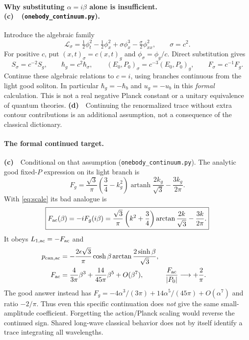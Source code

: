\documentclass[11pt,a4paper]{article}
\newcommand{\Lc}{\textbf{(c)}\ }
\newcommand{\Ld}{\textbf{(d)}\ }
\newcommand{\CC}{\texttt{onebody\_\allowbreak continuum.py}}
\begin{document}
\paragraph{Why substituting $\alpha=i\beta$ alone is insufficient.
\Lc\ (\CC).}
Introduce the algebraic family
\begin{equation}
 \mathcal L_\sigma=\tfrac12\phi_t^2-\tfrac12\phi_x^2
             +\sigma\phi_x^3-\tfrac\sigma2\phi_{xx}^2,
 \qquad \sigma=c^2.
\end{equation}
For positive $c$, put $(x,t)_\sigma=c(x,t)_g$ and
$\phi_\sigma=\phi_g/c$. Direct substitution gives
\begin{equation}
 S_\sigma=c^{-2}S_g,\qquad \hbar_g=c^2\hbar_\sigma,
 \qquad (E_0,P_0)_\sigma=c^{-3}(E_0,P_0)_g,
 \qquad F_\sigma=c^{-1}F_g. \label{eq:scale}
\end{equation}
Continue these algebraic relations to $c=i$, using branches continuous
from the light good soliton. In particular $\hbar_g=-\hbar_b$ and
$u_g=-u_b$ in this \emph{formal} calculation. This is not a real negative
Planck constant or a unitary equivalence of quantum theories.
\Ld\ Continuing the renormalized trace without extra contour contributions
is an additional assumption, not a consequence of the classical dictionary.

\paragraph{The formal continued target.}
\Lc\ Conditional on that assumption (\CC).
The analytic good fixed-$P$ expression on its light branch is
\begin{equation}
 F_g=\frac{\sqrt3}{\pi}\left(\frac34-k_g^2\right)
        \operatorname{artanh}\frac{2k_g}{\sqrt3}
           -\frac{3k_g}{2\pi}.
\end{equation}
With \eqref{eq:scale} its bad analogue is
\begin{equation}
 \boxed{F_{\rm ac}(\beta)=-iF_g(i\beta)
   =\frac{\sqrt3}{\pi}\left(k^2+\frac34\right)
          \arctan\frac{2k}{\sqrt3}-\frac{3k}{2\pi}.} \label{eq:Fac}
\end{equation}
It obeys $L_{1,\rm ac}=-F_{\rm ac}$ and
\begin{align}
 p_{\rm can,ac}&=-\frac{2\epsilon\sqrt3}{\pi}\cosh\beta
                      \arctan\frac{2\sinh\beta}{\sqrt3},\\
 F_{\rm ac}&=\frac4{3\pi}\beta^3+\frac{14}{45\pi}\beta^5+O(\beta^7),
 &\frac{F_{\rm ac}}{|P_0|}&\longrightarrow+\frac2\pi. \label{eq:aclimit}
\end{align}
The good answer instead has
$F_g=-4\alpha^3/(3\pi)+14\alpha^5/(45\pi)+O(\alpha^7)$ and ratio
$-2/\pi$. Thus even this specific continuation does \emph{not} give the
same small-amplitude coefficient. Forgetting the action/Planck scaling
would reverse the continued sign. Shared long-wave classical behavior
does not by itself identify a trace integrating all wavelengths.
\end{document}
